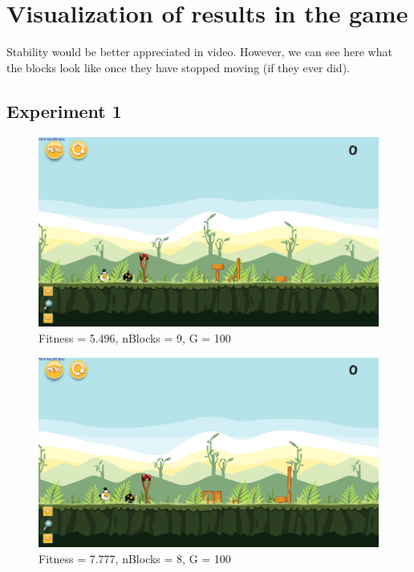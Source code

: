 \section{Visualization of results in the game}
Stability would be better appreciated in video. However, we can see here what the blocks look like once they have stopped moving (if they ever did).
\subsection{Experiment 1}\label{a:e1}

\begin{figure}[H]
	\centering
	\includegraphics[scale=0.35]{gfx/e1/level-0-180522_171359.png}
	\caption{Fitness = 5.496, nBlocks = 9, G = 100 }\label{f:e1-1}
\end{figure}

\begin{figure}[H]
	\centering
	\includegraphics[scale=0.35]{gfx/e1/level-0-180522_183913.png}
	\caption{Fitness = 7.777, nBlocks = 8, G = 100 }\label{f:e1-2}
\end{figure}

